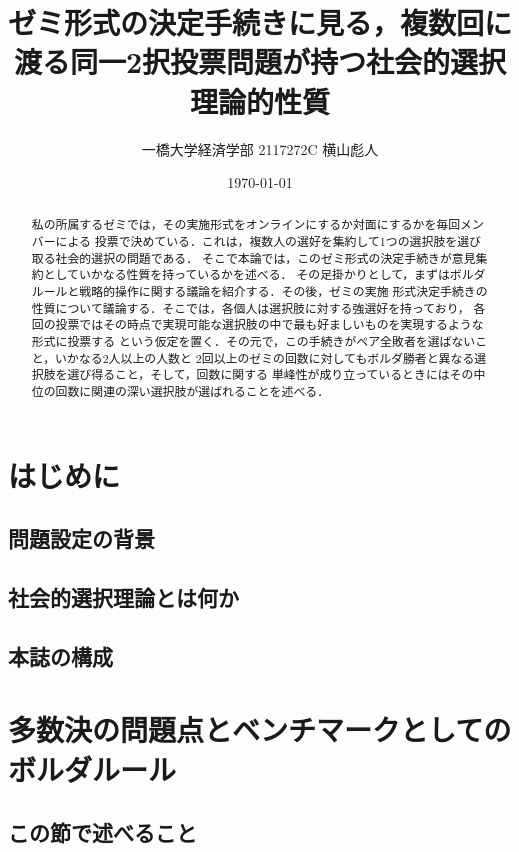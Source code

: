 \documentclass{jsarticle}
\begin{document}
\title{ゼミ形式の決定手続きに見る，複数回に渡る同一2択投票問題が持つ社会的選択理論的性質}
\author{一橋大学経済学部 2117272C 横山彪人}
\date{\today}
\maketitle

\begin{abstract}
  私の所属するゼミでは，その実施形式をオンラインにするか対面にするかを毎回メンバーによる
  投票で決めている．これは，複数人の選好を集約して1つの選択肢を選び取る社会的選択の問題である．
  そこで本論では，このゼミ形式の決定手続きが意見集約としていかなる性質を持っているかを述べる．
  その足掛かりとして，まずはボルダルールと戦略的操作に関する議論を紹介する．その後，ゼミの実施
  形式決定手続きの性質について議論する．そこでは，各個人は選択肢に対する強選好を持っており，
  各回の投票ではその時点で実現可能な選択肢の中で最も好ましいものを実現するような形式に投票する
  という仮定を置く．その元で，この手続きがペア全敗者を選ばないこと，いかなる2人以上の人数と
  2回以上のゼミの回数に対してもボルダ勝者と異なる選択肢を選び得ること，そして，回数に関する
  単峰性が成り立っているときにはその中位の回数に関連の深い選択肢が選ばれることを述べる．
\end{abstract}

\tableofcontents
\clearpage

\section{はじめに}
\subsection{問題設定の背景}
\subsection{社会的選択理論とは何か}
\subsection{本誌の構成}

\section{多数決の問題点とベンチマークとしてのボルダルール}
\subsection{この節で述べること}
\end{document}
